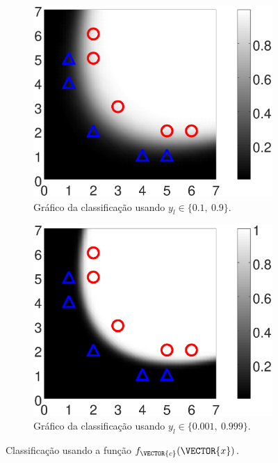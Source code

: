 \begin{figure}[!h]
    \begin{subfigure}[b]{0.45\textwidth}
        \centering
        \includegraphics[width=\textwidth]{chapters/classificacao/mfiles/reglogrnr1poly/ex1s1-reglogrnr1poly.eps}
        \caption{Gráfico da classificação usando $y_l \in \{0.1,~ 0.9\}$.}
        \label{fig:theo:reglogrnr1poly:xn:s1}
    \end{subfigure}
    \hfill
    \begin{subfigure}[b]{0.45\textwidth}
        \centering
        \includegraphics[width=\textwidth]{chapters/classificacao/mfiles/reglogrnr1poly/ex1s2-reglogrnr1poly.eps}
        \caption{Gráfico da classificação usando $y_l \in \{0.001,~ 0.999\}$.}
        \label{fig:theo:reglogrnr1poly:xn:s2}
    \end{subfigure}
    \caption{Classificação usando a função $f_{\VECTOR{c}}(\VECTOR{x})$.}
    \label{fig:theo:reglogrnr1poly:xn}
\end{figure}


